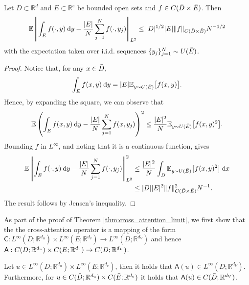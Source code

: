 \documentclass[twoside]{article}
\newcommand{\1}{\mathbbm{1}}
\newcommand{\R}{\mathbbm{R}}
\newcommand{\sA}{\mathsf{A}}
\newcommand{\sC}{\mathsf{C}}
\providecommand{\mathbbm}{\mathbb} %
\newcommand{\E}{\mathbb{E}}
\begin{document}
\begin{lemma}
\label{lemma:expectation_of_l2_cross}
Let \(D \subset \R^d\) and \(E \subset \R^e\) be bounded open sets and \(f \in C(\Bar{D} \times \Bar{E})\).
Then
\[ \E \left \| \int_E f(\cdot,y) \: \mathrm{d}y - \frac{|E|}{N} \sum_{j=1}^N f(\cdot,y_j) \right \|_{L^2} \leq |D|^{1/2} |E|\|f\|_{C(\Bar{D} \times \Bar{E})} N^{-1/2}\]
with the expectation taken over i.i.d. sequences \(\{y_j\}_{j=1}^N \sim U(\Bar{E})\).
\end{lemma}
\begin{proof}
Notice that, for any \(x \in \Bar{D}\),
\[\int_E f(x,y) \: \mathrm{d}y  = |E| \E_{y \sim U(\Bar{E})} \big[ f(x,y) \big ].\]
Hence, by expanding the square, we can observe that
\[\E \left ( \int_E f(x,y) \: \mathrm{d}y - \frac{|E|}{N} \sum_{j=1}^N f(x,y_j) \right )^2 \leq \frac{|E|^2}{N} \E_{y \sim U(\Bar{E})} \big [ f(x,y)^2 \big ].\]
Bounding $f$ in $L^\infty$, and noting that it is a continuous function, gives
\begin{align*}
\E \left \| \int_E f(\cdot,y) \: \mathrm{d}y - \frac{|E|}{N} \sum_{j=1}^N f(\cdot,y_j) \right \|^2_{L^2} &\leq \frac{|E|^2}{N} \int_D \E_{y \sim U(\Bar{E})} \big [ f(x,y)^2 \big ] \: \mathrm{d}x \\
&\leq |D||E|^2 \|f\|^2_{C(\Bar{D} \times \Bar{E})} N^{-1} .
\end{align*}
The result follows by Jensen's inequality. 
\end{proof}
As part of the proof of Theorem \ref{thm:cross_attention_limit}, we first show that the the cross-attention operator is a mapping of the form $\sC:L^\infty (D;\R^{d_u})\times L^\infty (E;\R^{d_v}) \to L^\infty (D; \R^{d_V})$ and hence $\sA: C (\Bar{D};\R^{d_u})\times C (\Bar{E};\R^{d_v}) \to C (\Bar{D}; \R^{d_V})$.
\begin{lemma}
\label{lemma:boundedness2}
    Let $u\in L^\infty (D;\R^{d_u})\times L^\infty (E;\R^{d_v})$, then it holds that $\sA(u)\in L^\infty(D;\R^{d_V})$. Furthermore, for $u \in C (\Bar{D};\R^{d_u})\times C (\Bar{E};\R^{d_v}) $ it holds that $\sA(u) \in C (\Bar{D};\R^{d_V})$.
\end{lemma}
\end{document}
